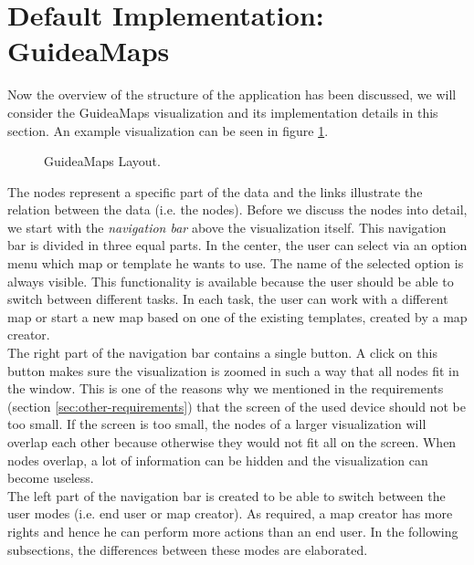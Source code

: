 \section{Default Implementation: GuideaMaps}
Now the overview of the structure of the application has been discussed, we will consider the GuideaMaps visualization and its implementation details in this section. An example visualization can be seen in figure \ref{fig:guideamaps}.
 
\begin{figure}[H]
	\centering
	\caption{GuideaMaps Layout.}
	\label{fig:guideamaps}
\end{figure}

The nodes represent a specific part of the data and the links illustrate the relation between the data (i.e. the nodes). Before we discuss the nodes into detail, we start with the \textit{navigation bar} above the visualization itself. This navigation bar is divided in three equal parts. In the center, the user can select via an option menu which map or template he wants to use. The name of the selected option is always visible. This functionality is available because the user should be able to switch between different tasks. In each task, the user can work with a different map or start a new map based on one of the existing templates, created by a map creator.\\

The right part of the navigation bar contains a single button. A click on this button makes sure the visualization is zoomed in such a way that all nodes fit in the window. This is one of the reasons why we mentioned in the requirements (section \ref{sec:other-requirements}) that the screen of the used device should not be too small. If the screen is too small, the nodes of a larger visualization will overlap each other because otherwise they would not fit all on the screen. When nodes overlap, a lot of information can be hidden and the visualization can become useless.\\

The left part of the navigation bar is created to be able to switch between the user modes (i.e. end user or map creator). As required, a map creator has more rights and hence he can perform more actions than an end user. In the following subsections, the differences between these modes are elaborated.





